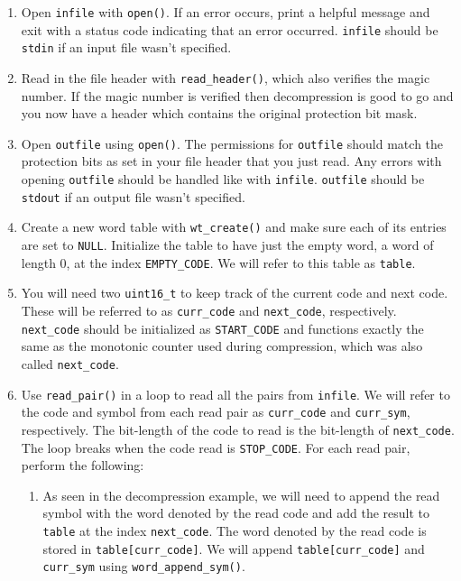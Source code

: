 \documentclass{article}
\begin{document}
\begin{enumerate}
    \item Open \texttt{infile} with \texttt{open()}. If an error occurs, print a
        helpful message and exit with a status code indicating that an error
        occurred. \texttt{infile} should be \texttt{stdin} if an input file
        wasn't specified.

    \item Read in the file header with \texttt{read\_header()}, which also
        verifies the magic number. If the magic number is verified then
        decompression is good to go and you now have a header which contains the
        original protection bit mask.

    \item Open \texttt{outfile} using \texttt{open()}. The permissions for
        \texttt{outfile} should match the protection bits as set in your file
        header that you just read. Any errors with opening \texttt{outfile}
        should be handled like with \texttt{infile}. \texttt{outfile} should be
        \texttt{stdout} if an output file wasn't specified.

    \item Create a new word table with \texttt{wt\_create()} and make sure each
        of its entries are set to \texttt{NULL}. Initialize the table to have
        just the empty word, a word of length 0, at the index
        \texttt{EMPTY\_CODE}. We will refer to this table as \texttt{table}.

    \item You will need two \texttt{uint16\_t} to keep track of the
        current code and next code. These will be referred to as
        \texttt{curr\_code} and \texttt{next\_code}, respectively.
        \texttt{next\_code} should be initialized as \texttt{START\_CODE} and
        functions exactly the same as the monotonic counter used during
        compression, which was also called \texttt{next\_code}.

    \item Use \texttt{read\_pair()} in a loop to read all the pairs from
        \texttt{infile}. We will refer to the code and symbol from each read
        pair as \texttt{curr\_code} and \texttt{curr\_sym}, respectively. The
        bit-length of the code to read is the bit-length of \texttt{next\_code}. The
        loop breaks when the code read is \texttt{STOP\_CODE}. For each read
        pair, perform the following:

        \begin{enumerate}
            \item As seen in the decompression example, we will need to append
                the read symbol with the word denoted by the read code and add
                the result to \texttt{table} at the index \texttt{next\_code}.
                The word denoted by the read code is stored in
                \texttt{table[curr\_code]}. We will append
                \texttt{table[curr\_code]} and \texttt{curr\_sym} using
                \texttt{word\_append\_sym()}.


\end{enumerate}
\end{enumerate}
\end{document}
